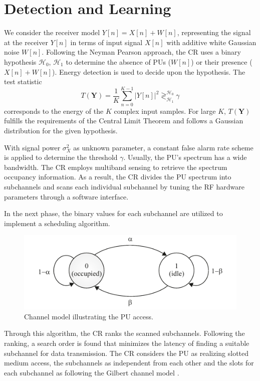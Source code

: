 \documentclass[conference,a4paper]{IEEEtran}
\begin{document}
\section{Detection and Learning} \label{sec:dect} 
We consider the receiver model $Y[n] = X[n] + W[n]$, 
representing the signal at the receiver $Y[n]$ in terms of input signal $X[n]$ with additive white Gaussian noise $W[n]$. 
Following the Neyman Pearson approach, the CR uses a binary hypothesis $\mathcal{H}_0$, $\mathcal{H}_1$ to determine the absence
of PUs ($W[n]$) or their presence ($X[n]+W[n]$).
Energy detection \cite{Urkowitz} is used to decide upon the hypothesis.
The test statistic
\begin{equation}\label{eq:Hypo}
T(\textbf{Y}) = \frac{1}{K} \sum\limits_{n=0}^{K-1} |Y[n]|^2 \mathop{\gtrless}_{\mathcal{H}_1}^{\mathcal{H}_0} \gamma
\end{equation}
corresponds to the energy of the $K$ complex input samples.
For large $K$, $T(\textbf{Y})$ fulfills the requirements of the 
Central Limit Theorem and follows a Gaussian distribution for the given
hypothesis.

With signal power $\sigma_X^{2}$ as  unknown parameter, a
constant false alarm rate scheme is applied to determine the threshold
$\gamma$. Usually, the PU's spectrum has a wide bandwidth.
The CR employs multiband sensing to retrieve the spectrum occupancy information.
As a result, the CR divides the PU spectrum into subchannels and scans each individual
subchannel by tuning the RF hardware parameters through a software interface.

In the next phase, the binary values for each subchannel are utilized to implement a scheduling algorithm. 
\begin{figure}[!t]
	\centering
	\includegraphics{figures/Markov_channel_mod2}
	\caption{Channel model illustrating the PU access.}
	\label{fig:ChannelModel}
\end{figure}
Through this algorithm, the CR ranks the scanned subchannels.
Following the ranking, a search order is found that minimizes the latency of
finding a suitable subchannel for data transmission.
The CR considers the PU as realizing slotted medium access, the subchannels as independent from each other and the
slots for each subchannel as following the Gilbert channel model \cite{Gilbert}. 
\end{document}
